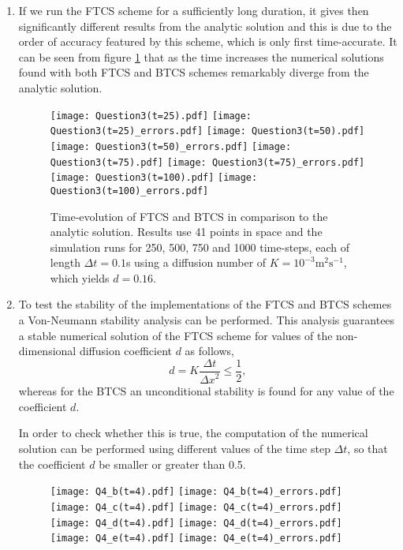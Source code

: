 \documentclass[12pt]{article}
\begin{document}
\begin{enumerate}
\item If we run the FTCS scheme for a sufficiently long duration, it gives then significantly different results from the analytic solution and this is due to the order of accuracy featured by this scheme, which is only first time-accurate. It can be seen from figure \ref{fig:Q3} that as the time increases the numerical solutions found with both FTCS and BTCS schemes remarkably diverge from the analytic solution.

\begin{figure}[!tbh]
\texttt{[image: Question3(t=25).pdf]}
\texttt{[image: Question3(t=25)\_errors.pdf]}
\texttt{[image: Question3(t=50).pdf]}
\texttt{[image: Question3(t=50)\_errors.pdf]}
\texttt{[image: Question3(t=75).pdf]}
\texttt{[image: Question3(t=75)\_errors.pdf]}
\texttt{[image: Question3(t=100).pdf]}
\texttt{[image: Question3(t=100)\_errors.pdf]}

\caption{Time-evolution of FTCS and BTCS in comparison to the analytic solution. Results
use 41 points in space and the simulation runs for 250, 500, 750 and 1000 time-steps,
each of length $\Delta t=0.1$s using a diffusion number of $K=10^{-3}\text{m}^{2}\text{s}^{-1}$, which yields $d=0.16$.
\label{fig:Q3}}
\end{figure}

\item To test the stability of the implementations of the FTCS and BTCS schemes a Von-Neumann stability analysis can be performed. This analysis guarantees a stable numerical solution of the FTCS scheme for values of the non-dimensional diffusion coefficient $d$ as follows,
\begin{equation}
d=K\frac{\Delta t}{{\Delta x}^2} \leq \frac{1}{2},
\end{equation}
whereas for the BTCS an unconditional stability is found for any value of the coefficient $d$.\par
In order to check whether this is true, the computation of the numerical solution can be performed using different values of the time step $\Delta t$, so that the coefficient $d$ be smaller or greater than 0.5.

\begin{figure}[!tbh]
\texttt{[image: Q4\_b(t=4).pdf]}
\texttt{[image: Q4\_b(t=4)\_errors.pdf]}
\texttt{[image: Q4\_c(t=4).pdf]}
\texttt{[image: Q4\_c(t=4)\_errors.pdf]}
\texttt{[image: Q4\_d(t=4).pdf]}
\texttt{[image: Q4\_d(t=4)\_errors.pdf]}
\texttt{[image: Q4\_e(t=4).pdf]}
\texttt{[image: Q4\_e(t=4)\_errors.pdf]}


\end{figure}
\end{enumerate}
\end{document}
